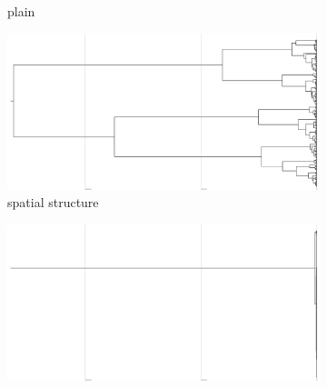 \begin{figure}
\begin{subfigure}[b]{0.5\columnwidth}
    \caption{%
      plain}
  \end{subfigure}
  \hfill
  \begin{subfigure}[b]{0.5\columnwidth}
    \includegraphics[height=0.12\textheight,width=\textwidth]{img/perfect-tree-phylogenies-log/epoch=7+resolution=3+treatment=6/a=collapsed-phylogeny+epoch=00007+mut_distn=np.random.standard_normal+num_generations=32768+num_islands=1024+num_niches=1+p_island_migration=0.01+p_niche_invasion=3.0517578125e-08+population_size=3276.../8+replicate=0+tournament_size=2+treatment=6+_generation=262144+_index=6+scale=nonlog+ext=.pdf}
    \caption{%
      spatial structure}
  \end{subfigure}
  \hfill
  \begin{subfigure}[b]{0.5\columnwidth}
    \includegraphics[height=0.12\textheight,width=\textwidth]{img/perfect-tree-phylogenies-log/epoch=7+resolution=3+treatment=26/a=collapsed-phylogeny+epoch=00007+mut_distn=np.random.standard_normal+num_generations=32768+num_islands=1+num_niches=4+p_island_migration=0.01+p_niche_invasion=3.0517578125e-06+population_size=32768+r.../eplicate=0+tournament_size=2+treatment=26+_generation=262144+_index=26+scale=nonlog+ext=.pdf}

\end{subfigure}
\end{figure}
